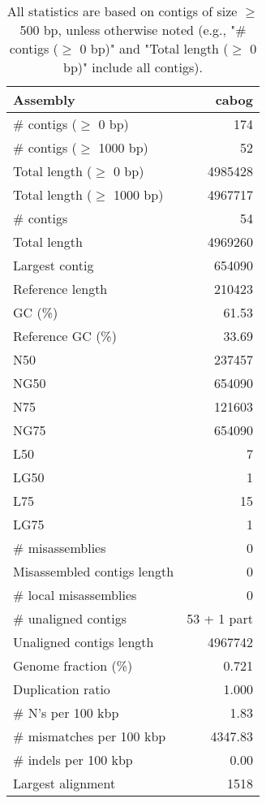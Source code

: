 \documentclass[12pt,a4paper]{article}
\begin{document}
\begin{table}[ht]
\begin{center}
\caption{All statistics are based on contigs of size $\geq$ 500 bp, unless otherwise noted (e.g., "\# contigs ($\geq$ 0 bp)" and "Total length ($\geq$ 0 bp)" include all contigs).}
\begin{tabular}{|l*{1}{|r}|}
\hline
Assembly & cabog \\ \hline
\# contigs ($\geq$ 0 bp) & 174 \\ \hline
\# contigs ($\geq$ 1000 bp) & 52 \\ \hline
Total length ($\geq$ 0 bp) & 4985428 \\ \hline
Total length ($\geq$ 1000 bp) & 4967717 \\ \hline
\# contigs & 54 \\ \hline
Total length & 4969260 \\ \hline
Largest contig & 654090 \\ \hline
Reference length & 210423 \\ \hline
GC (\%) & 61.53 \\ \hline
Reference GC (\%) & 33.69 \\ \hline
N50 & 237457 \\ \hline
NG50 & 654090 \\ \hline
N75 & 121603 \\ \hline
NG75 & 654090 \\ \hline
L50 & 7 \\ \hline
LG50 & 1 \\ \hline
L75 & 15 \\ \hline
LG75 & 1 \\ \hline
\# misassemblies & 0 \\ \hline
Misassembled contigs length & 0 \\ \hline
\# local misassemblies & 0 \\ \hline
\# unaligned contigs & 53 + 1 part \\ \hline
Unaligned contigs length & 4967742 \\ \hline
Genome fraction (\%) & 0.721 \\ \hline
Duplication ratio & 1.000 \\ \hline
\# N's per 100 kbp & 1.83 \\ \hline
\# mismatches per 100 kbp & 4347.83 \\ \hline
\# indels per 100 kbp & 0.00 \\ \hline
Largest alignment & 1518 \\ \hline
\end{tabular}
\end{center}
\end{table}
\end{document}
